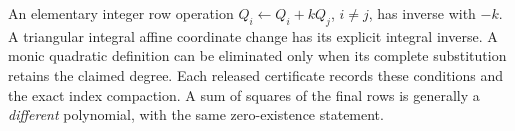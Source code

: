 An elementary integer row operation $Q_i\leftarrow Q_i+kQ_j$,
$i\ne j$, has inverse with $-k$. A triangular integral affine coordinate
change has its explicit integral inverse. A monic quadratic definition
can be eliminated only when its complete substitution retains the claimed
degree. Each released certificate records these conditions and the exact
index compaction. A sum of squares of the final rows is generally a
\emph{different} polynomial, with the same zero-existence statement.



